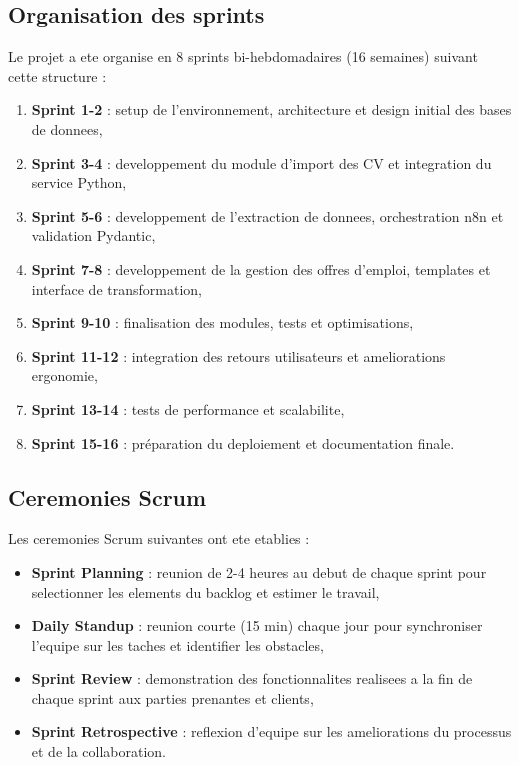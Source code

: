 \subsection{Organisation des sprints}

Le projet a ete organise en 8 sprints bi-hebdomadaires (16 semaines) suivant cette structure :

\begin{enumerate}
    \item \textbf{Sprint 1-2} : setup de l'environnement, architecture et design initial des bases de donnees,
    
    \item \textbf{Sprint 3-4} : developpement du module d'import des CV et integration du service Python,
    
    \item \textbf{Sprint 5-6} : developpement de l'extraction de donnees, orchestration n8n et validation Pydantic,
    
    \item \textbf{Sprint 7-8} : developpement de la gestion des offres d'emploi, templates et interface de transformation,
    
    \item \textbf{Sprint 9-10} : finalisation des modules, tests et optimisations,
    
    \item \textbf{Sprint 11-12} : integration des retours utilisateurs et ameliorations ergonomie,
    
    \item \textbf{Sprint 13-14} : tests de performance et scalabilite,
    
    \item \textbf{Sprint 15-16} : préparation du deploiement et documentation finale.
\end{enumerate}

\subsection{Ceremonies Scrum}

Les ceremonies Scrum suivantes ont ete etablies :

\begin{itemize}
    \item \textbf{Sprint Planning} : reunion de 2-4 heures au debut de chaque sprint pour selectionner les elements du backlog et estimer le travail,
    
    \item \textbf{Daily Standup} : reunion courte (15 min) chaque jour pour synchroniser l'equipe sur les taches et identifier les obstacles,
    
    \item \textbf{Sprint Review} : demonstration des fonctionnalites realisees a la fin de chaque sprint aux parties prenantes et clients,
    
    \item \textbf{Sprint Retrospective} : reflexion d'equipe sur les ameliorations du processus et de la collaboration.
\end{itemize}

